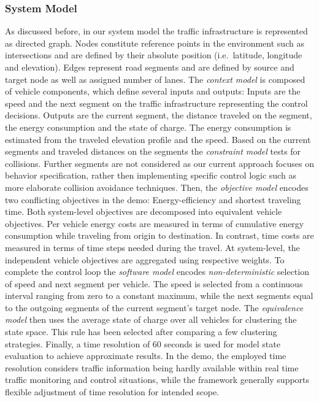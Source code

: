 \documentclass[conference]{../cls/IEEEtran}
\begin{document}
\subsubsection*{System Model}

As discussed before, in our system model the traffic infrastructure is
represented as directed graph. Nodes constitute reference points in the
environment such as intersections and are defined by their absolute position
(i.e.\ latitude, longitude and elevation). Edges represent road segments and are
defined by source and target node as well as assigned number of lanes. The
\textit{context model} is composed of vehicle components, which define several
inputs and outputs: Inputs are the speed and the next segment on the traffic
infrastructure representing the control decisions. Outputs are the current
segment, the distance traveled on the segment, the energy consumption and the
state of charge. The energy consumption is estimated from the traveled elevation
profile and the speed. Based on the current segments and traveled distances on
the segments the \textit{constraint model} tests for collisions. Further
segments are not considered as our current approach focuses on behavior
specification, rather then implementing specific control logic such as more elaborate collision
avoidance techniques.
Then, the \textit{objective model} encodes two conflicting objectives in the
demo: Energy-efficiency and shortest traveling time. Both system-level
objectives are decomposed into equivalent vehicle objectives. Per vehicle energy costs are measured in terms of
cumulative energy consumption while traveling from origin to destination. In
contrast, time costs are measured in terms of time steps needed during the
travel. At system-level, the independent vehicle objectives are aggregated using
respective weights. To complete the control loop the \textit{software model}
encodes \textit{non-deterministic} selection of speed and next segment per
vehicle. The speed is selected from a continuous interval ranging from zero to a
constant maximum, while the next segments equal to the outgoing segments of the
current segment's target node. The \textit{equivalence model} then uses the
average state of charge over all vehicles for clustering the state space. This
rule has been selected after comparing a few clustering strategies. Finally, a
time resolution of 60 seconds is used for model state evaluation to achieve
approximate results. In the demo, the employed time resolution considers
traffic information being hardly available within real time traffic monitoring
and control situations, while the framework generally supports flexible
adjustment of time resolution for intended scope.
\end{document}
